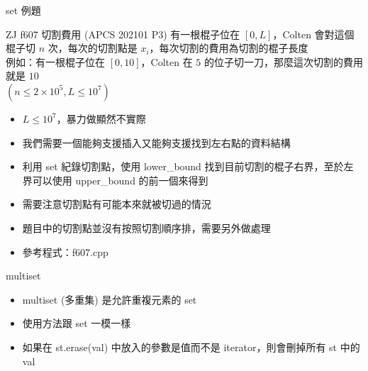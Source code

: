 \documentclass[aspectratio=169]{beamer}
\begin{document}
    \begin{frame}{set 例題}
        \begin{block}{ZJ f607 切割費用 (APCS 202101 P3)}
            有一根棍子位在 $[0, L]$，Colten 會對這個棍子切 $n$ 次，每次的切割點是 $x_i$，每次切割的費用為切割的棍子長度\\
            例如：有一根棍子位在 $[0, 10]$，Colten 在 $5$ 的位子切一刀，那麼這次切割的費用就是 $10$\\
            $(n \le 2 \times 10^5, L \le 10^7)$
        \end{block}

        \begin{itemize}
            \item<2-> $L \le 10^7$，暴力做顯然不實際
            \item<3-> 我們需要一個能夠支援插入又能夠支援找到左右點的資料結構
            \item<4-> 利用 set 紀錄切割點，使用 lower\_bound 找到目前切割的棍子右界，至於左界可以使用 upper\_bound 的前一個來得到
            \item<5-> 需要注意切割點有可能本來就被切過的情況
            \item<6-> 題目中的切割點並沒有按照切割順序排，需要另外做處理
            \item<6-> 參考程式：f607.cpp
        \end{itemize}
    \end{frame}

    \begin{frame}{multiset}
        \begin{itemize}
            \item<1-> multiset (多重集) 是允許重複元素的 set
            \item<1-> 使用方法跟 set 一模一樣
            \item<2-> 如果在 st.erase(val) 中放入的參數是值而不是 iterator，則會刪掉所有 st 中的 val
        \end{itemize}
    \end{frame}
\end{document}
